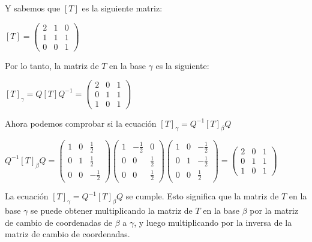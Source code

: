 \begin{enumerate}
    Y sabemos que $[T]$ es la siguiente matriz:

    \begin{center}
        $
        [T] = 
            \begin{pmatrix}
                2 & 1 & 0 \\
                1 & 1 & 1 \\
                0 & 0 & 1
            \end{pmatrix}
        $
    \end{center}

    Por lo tanto, la matriz de $T$ en la base $\gamma$ es la siguiente:

    \begin{center}
        $
        [T]_{\gamma} = Q [T] Q^{-1} = 
            \begin{pmatrix}
                2 & 0 & 1 \\
                0 & 1 & 1 \\
                1 & 0 & 1
            \end{pmatrix}
        $    
    \end{center}

    Ahora podemos comprobar si la ecuación $\left[ T \right]_{\gamma} = Q^{-1} \left[ T \right]_{\beta} Q$ 

    \begin{center}
        $
        Q^{-1} \left[ T \right]_{\beta} Q = 
            \begin{pmatrix}
                1 & 0 & \frac{1}{2} \\
                0 & 1 & \frac{1}{2} \\
                0 & 0 & -\frac{1}{2}
            \end{pmatrix}
            \begin{pmatrix}
                1 & -\frac{1}{2} & 0 \\
                0 & 0 & \frac{1}{2} \\
                0 & 0 & \frac{1}{2}
            \end{pmatrix}
            \begin{pmatrix}
                1 & 0 & -\frac{1}{2} \\
                0 & 1 & -\frac{1}{2} \\
                0 & 0 & \frac{1}{2}
            \end{pmatrix} = 
            \begin{pmatrix}
                2 & 0 & 1 \\
                0 & 1 & 1 \\
                1 & 0 & 1
            \end{pmatrix}
        $
    \end{center}


    La ecuación $\left[ T \right]_{\gamma} = Q^{-1} \left[ T \right]_{\beta} Q$ se cumple. Esto significa que
    la matriz de $T$ en la base $\gamma$ se puede obtener multiplicando la matriz de $T$ en la base $\beta$
    por la matriz de cambio de coordenadas de $\beta$ a $\gamma$, y luego multiplicando por la inversa de
    la matriz de cambio de coordenadas.
\end{enumerate}